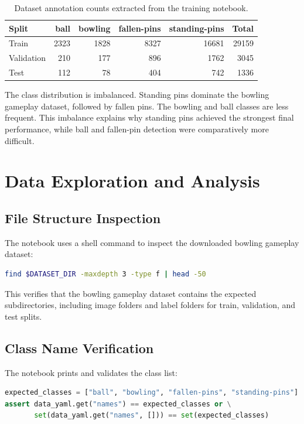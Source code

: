 \documentclass[12pt,a4paper]{article}
\begin{document}
\begin{table}[H]
\centering
\caption{Dataset annotation counts extracted from the training notebook.}
\label{tab:bowling gameplay dataset_stats}
\begin{tabular}{lrrrrr}
\toprule
\textbf{Split} & \textbf{ball} & \textbf{bowling} & \textbf{fallen-pins} & \textbf{standing-pins} & \textbf{Total} \\
\midrule
Train & 2323 & 1828 & 8327 & 16681 & 29159 \\
Validation & 210 & 177 & 896 & 1762 & 3045 \\
Test & 112 & 78 & 404 & 742 & 1336 \\
\bottomrule
\end{tabular}
\end{table}

The class distribution is imbalanced. Standing pins dominate the bowling gameplay dataset, followed by fallen pins. The bowling and ball classes are less frequent. This imbalance explains why standing pins achieved the strongest final performance, while ball and fallen-pin detection were comparatively more difficult.

\section{Data Exploration and Analysis}

\subsection{File Structure Inspection}

The notebook uses a shell command to inspect the downloaded bowling gameplay dataset:
\begin{lstlisting}[language=bash]
find $DATASET_DIR -maxdepth 3 -type f | head -50
\end{lstlisting}

This verifies that the bowling gameplay dataset contains the expected subdirectories, including image folders and label folders for train, validation, and test splits.

\subsection{Class Name Verification}

The notebook prints and validates the class list:
\begin{lstlisting}[language=Python]
expected_classes = ["ball", "bowling", "fallen-pins", "standing-pins"]
assert data_yaml.get("names") == expected_classes or \
       set(data_yaml.get("names", [])) == set(expected_classes)
\end{lstlisting}
\end{document}
